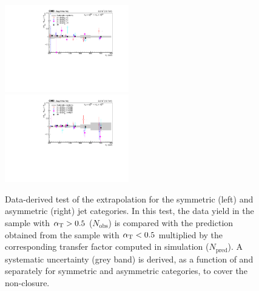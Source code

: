 \clearpage
\begin{figure}[tbhp]
    \caption{ 
  Data-derived test of the \alt extrapolation for the symmetric (left) and asymmetric (right) jet categories. 
  In this test, the data yield in the \mj sample with $\alpha_{\text{T}}>0.5$ ($N_{\mathrm{obs}}$) 
  is compared with the prediction obtained from the \mj sample with $\alpha_{\text{T}}<0.5$ multiplied by the corresponding 
  transfer factor computed in simulation ($N_{\mathrm{pred}}$). 
  A systematic uncertainty (grey band) is derived, as a function of \scalht and separately for symmetric and asymmetric categories, 
  to cover the non-closure. 
    \label{fig:CT-alphaT} }
  \begin{center}
     \includegraphics[width=0.48\textwidth]{figures/alphaTsym__noFit} ~~
     \includegraphics[width=0.48\textwidth]{figures/alphaTasym__noFit}
  \end{center}
\end{figure}

